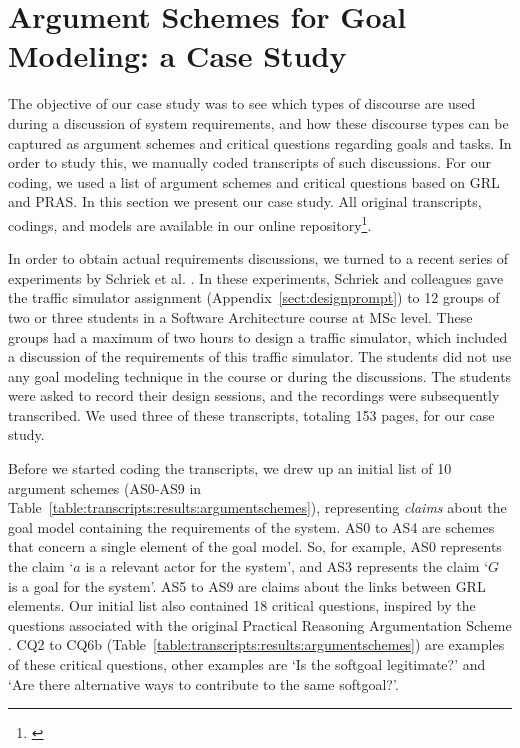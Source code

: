 \section{Argument Schemes for Goal Modeling: a Case Study}
\label{sect:gmas}


The objective of our case study was to see which types of discourse are used during a discussion of system requirements, and how these discourse types can be captured as argument schemes and critical questions regarding goals and tasks. In order to study this, we manually coded transcripts of such discussions. For our coding, we used a list of argument schemes and critical questions based on GRL and PRAS. In this section we present our case study. All original transcripts, codings, and models are available in our online repository\footnote{\label{foot:url}}.   

In order to obtain actual requirements discussions, we turned to a recent series of experiments by Schriek et al. \cite{SchriekEtal2016}. In these experiments, Schriek and colleagues gave the traffic simulator assignment (Appendix~\ref{sect:designprompt}) to 12 groups of two or three students in a Software Architecture course at MSc level. These groups had a maximum of two hours to design a traffic simulator, which included a discussion of the requirements of this traffic simulator. The students did not use any goal modeling technique in the course or during the discussions. The students were asked to record their design sessions, and the recordings were subsequently transcribed. We used three of these transcripts, totaling 153 pages, for our case study. 

Before we started coding the transcripts, we drew up an initial list of 10 argument schemes (AS0-AS9 in Table~\ref{table:transcripts:results:argumentschemes}), representing \emph{claims} about the goal model containing the requirements of the system. AS0 to AS4 are schemes that concern a single element of the goal model. So, for example, AS0 represents the claim `$a$ is a relevant actor for the system', and AS3 represents the claim `$G$ is a goal for the system'. AS5 to AS9 are claims about the links between GRL elements. Our initial list also contained 18 critical questions, inspired by the questions associated with the original Practical Reasoning Argumentation Scheme \cite{atkinson2007}. CQ2 to CQ6b (Table~\ref{table:transcripts:results:argumentschemes}) are examples of these critical questions, other examples are `Is the softgoal legitimate?' and `Are there alternative ways to contribute to the same softgoal?'.

